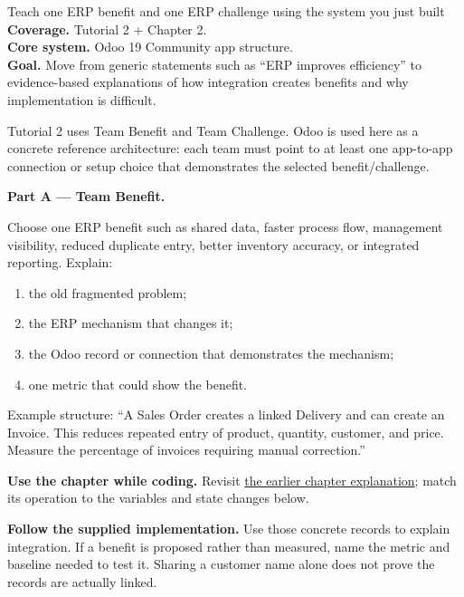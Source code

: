 
\begin{labproject}{Teach one ERP benefit and one ERP challenge using the system you just built}
\textbf{Coverage.} Tutorial 2 + Chapter 2.\\
\textbf{Core system.} Odoo 19 Community app structure.\\
\textbf{Goal.} Move from generic statements such as ``ERP improves efficiency'' to evidence-based explanations of how integration creates benefits and why implementation is difficult.




\begin{labmode}
Tutorial 2 uses Team Benefit and Team Challenge. Odoo is used here as a concrete reference architecture: each team must point to at least one app-to-app connection or setup choice that demonstrates the selected benefit/challenge.
\end{labmode}

\medskip\noindent\textbf{Part A --- Team Benefit.}

Choose one ERP benefit such as shared data, faster process flow, management visibility, reduced duplicate entry, better inventory accuracy, or integrated reporting. Explain:
\begin{enumerate}
  \item the old fragmented problem;
  \item the ERP mechanism that changes it;
  \item the Odoo record or connection that demonstrates the mechanism;
  \item one metric that could show the benefit.
\end{enumerate}

Example structure: ``A Sales Order creates a linked Delivery and can create an Invoice. This reduces repeated entry of product, quantity, customer, and price. Measure the percentage of invoices requiring manual correction.''




\textbf{Use the chapter while coding.} Revisit \hyperref[ch:erp-development]{the earlier chapter explanation}; match its operation to the variables and state changes below.

\textbf{Follow the supplied implementation.} Use those concrete records to explain integration. If a benefit is proposed rather than measured, name the metric and baseline needed to test it. Sharing a customer name alone does not prove the records are actually linked.



\end{labproject}
